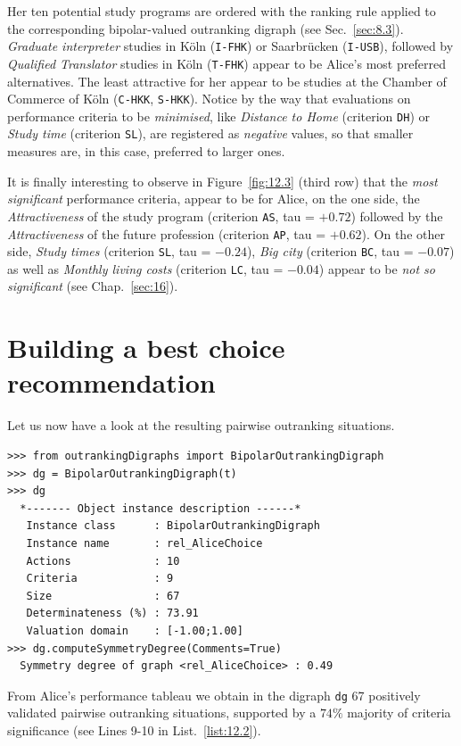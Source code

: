 Her ten potential study programs are ordered with the \NetFlows ranking rule applied to the corresponding bipolar-valued outranking digraph (see Sec.~\ref{sec:8.3}). \emph{Graduate interpreter} studies in Köln (\texttt{I-FHK}) or Saarbrücken (\texttt{I-USB}), followed by \emph{Qualified Translator} studies in Köln (\texttt{T-FHK}) appear to be Alice's most preferred alternatives. The least attractive for her appear to be studies at the Chamber of Commerce of Köln (\texttt{C-HKK}, \texttt{S-HKK}). Notice by the way that evaluations on performance criteria to be \emph{minimised}, like \emph{Distance to Home} (criterion \texttt{DH}) or \emph{Study time} (criterion \texttt{SL}), are registered as \emph{negative} values, so that smaller measures are, in this case, preferred to larger ones.

It is finally interesting to observe in Figure~\vref{fig:12.3} (third row) that the \emph{most significant} performance criteria, appear to be for Alice, on the one side, the \emph{Attractiveness} of the study program (criterion \texttt{AS}, tau = $+0.72$) followed by the \emph{Attractiveness} of the future profession (criterion \texttt{AP}, tau = $+0.62$). On the other side, \emph{Study times} (criterion \texttt{SL}, tau = $-0.24$), \emph{Big city} (criterion \texttt{BC}, tau = $-0.07$) as well as \emph{Monthly living costs} (criterion \texttt{LC}, tau = $-0.04$) appear to be \emph{not so significant} (see Chap.~\ref{sec:16}).

\section{Building a best choice recommendation}
\label{sec:12.3}

Let us now have a look at the resulting pairwise outranking situations.
\begin{lstlisting}[caption={Computing Alice's outranking digraph},label=list:12.2]
>>> from outrankingDigraphs import BipolarOutrankingDigraph
>>> dg = BipolarOutrankingDigraph(t) 
>>> dg
  *------- Object instance description ------*
   Instance class      : BipolarOutrankingDigraph
   Instance name       : rel_AliceChoice
   Actions             : 10
   Criteria            : 9
   Size                : 67
   Determinateness (%) : 73.91
   Valuation domain    : [-1.00;1.00]
>>> dg.computeSymmetryDegree(Comments=True)
  Symmetry degree of graph <rel_AliceChoice> : 0.49
\end{lstlisting}

From Alice's performance tableau we obtain in the digraph \texttt{dg}  67 positively validated pairwise outranking situations, supported by a $74\%$ majority of criteria significance (see Lines 9-10 in List.~\vref{list:12.2}).

